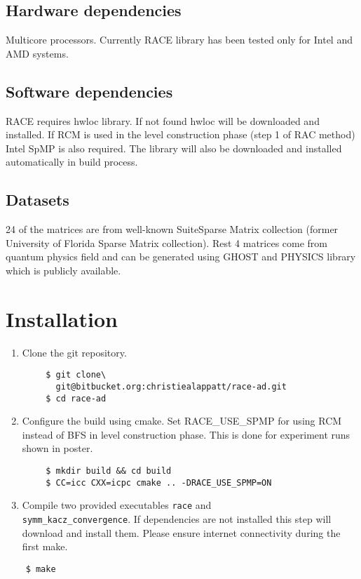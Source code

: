 	\subsection{Hardware dependencies}
	Multicore processors. Currently RACE library has been tested only for Intel and AMD systems.
	
	\subsection{Software dependencies}
	RACE requires hwloc \cite{hwloc} library. If not found hwloc will be downloaded and installed. If RCM is used in the level construction phase (step 1 of RAC method) Intel SpMP \cite{SpMP} is also required. The library will also be downloaded and installed automatically in build process.
	
	\subsection{Datasets}
	24 of the matrices are from well-known SuiteSparse Matrix collection \cite{UOF} (former University of Florida Sparse Matrix collection). Rest 4 matrices come from quantum physics field and can be generated using GHOST and PHYSICS library \cite{essex_repo} which is publicly available.
	
	\section{Installation}
	\begin{enumerate}
		\item Clone the git repository.
	\end{enumerate}
	\begin{lstlisting}
		$ git clone\
		  git@bitbucket.org:christiealappatt/race-ad.git
		$ cd race-ad
	\end{lstlisting}
	\begin{enumerate}
		 \setcounter{enumi}{1}
		\item Configure the build using cmake. Set RACE\_USE\_SPMP for using RCM instead of BFS in level construction phase. This is done for experiment runs shown in poster.	
	\end{enumerate}
	\begin{lstlisting}
		$ mkdir build && cd build
		$ CC=icc CXX=icpc cmake .. -DRACE_USE_SPMP=ON
	\end{lstlisting}
	\begin{enumerate}
		\setcounter{enumi}{2}
		\item Compile two provided executables \texttt{race} and\\ \texttt{symm\_kacz\_convergence}. If dependencies are not installed this step will download and install them. Please ensure internet connectivity during the first make.
	\end{enumerate}
	\begin{lstlisting}
	$ make
	\end{lstlisting}
	
